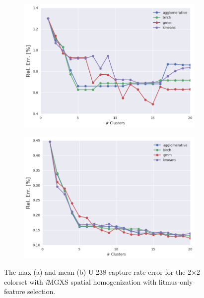 \begin{figure}[h!]
\centering
\begin{subfigure}{0.9\textwidth}
  \centering
  \includegraphics[width=\linewidth]{figures/results/err-by-cluster/2x2/max-rel-err}
  \caption{}
  \label{fig:chap11-max-capt-err-by-cluster-assm-2x2}
\end{subfigure}
\begin{subfigure}{0.9\textwidth}
  \centering
  \includegraphics[width=\linewidth]{figures/results/err-by-cluster/2x2/mean-rel-err}
  \caption{}
  \label{fig:chap11-mean-capt-err-by-cluster-assm-2x2}
\end{subfigure}
\caption[U-238 capture rate errors for the 2$\times$2 colorset]{The max (a) and mean (b) U-238 capture rate error for the 2$\times$2 colorset with \textit{i}\ac{MGXS} spatial homogenization with litmus-only feature selection.}
\label{fig:chap11-capt-err-by-cluster-assm-2x2}
\end{figure}

